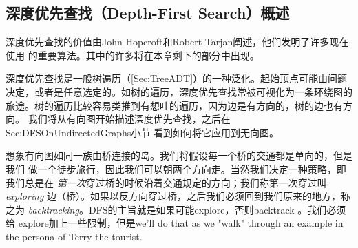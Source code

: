 \subsection{深度优先查找（Depth-First Search）概述}\label{Sec:OverViewofDFS}
深度优先查找的价值由John Hopcroft和Robert Tarjan阐述，他们发明了许多现在使用
的重要算法。其中的许多将在本章剩下的部分中出现。

深度优先查找是一般树遍历（\ref{Sec:TreeADT}）的一种泛化。起始顶点可能由问题
决定，或者是任意选定的。如树的遍历，深度优先查找常被可视化为一条环绕图的
旅途。树的遍历比较容易类推到有想吐的遍历，因为边是有方向的，树的边也有方向。
我们将从有向图开始描述深度优先查找，之后在{Sec:DFSOnUndirectedGraphs}小节
看到如何将它应用到无向图。

想象有向图如同一族由桥连接的岛。我们将假设每一个桥的交通都是单向的，但是我们
做一个徒步旅行，因此我们可以朝两个方向走。当然我们决定一种策略，即我们总是在
\emph{第一次}穿过桥的时候沿着交通规定的方向；我们称第一次穿过叫\emph{exploring}
边（桥）。如果以反方向穿过桥，之后我们必须回到我们原来的地方，称之为
\emph{backtracking}。DFS的主旨就是如果可能explore，否则backtrack 。我们必须给
explore加上一些限制，但是we'll do that as we "walk" through an example in the
persona of Terry the tourist.

